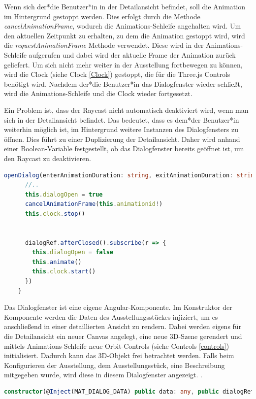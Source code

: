 Wenn sich der*die Benutzer*in in der Detailansicht befindet, soll die Animation im Hintergrund gestoppt werden. Dies erfolgt durch die Methode \emph{cancelAnimationFrame}, wodurch die Animations-Schleife angehalten wird. Um den aktuellen Zeitpunkt zu erhalten, zu dem die Animation gestoppt wird, wird die \emph{requestAnimationFrame} Methode verwendet. Diese wird in der Animations-Schleife aufgerufen und dabei wird der aktuelle Frame der Animation zurück geliefert. Um sich nicht mehr weiter in der Ausstellung fortbewegen zu können, wird die Clock (siehe Clock \ref{Clock}) gestoppt, die für die Three.js Controls benötigt wird. Nachdem der*die Benutzer*in das Dialogfenster wieder schließt, wird die Animations-Schleife und die Clock wieder fortgesetzt. 

Ein Problem ist, dass der Raycast nicht automatisch deaktiviert wird, wenn man sich in der Detailansicht befindet. Das bedeutet, dass es dem*der Benutzer*in weiterhin möglich ist, im Hintergrund weitere Instanzen des Dialogfensters zu öffnen. Dies führt zu einer Duplizierung der Detailansicht. Daher wird anhand einer Boolean-Variable festgestellt, ob das Dialogfenster bereits geöffnet ist, um den Raycast zu deaktivieren. 

\begin{lstlisting}[caption={Öffnen und Schließen des Dialogfensters},language=TypeScript]
  openDialog(enterAnimationDuration: string, exitAnimationDuration: string): void {
      //..
      this.dialogOpen = true
      cancelAnimationFrame(this.animationid!)
      this.clock.stop()
  
  
      dialogRef.afterClosed().subscribe(r => {
        this.dialogOpen = false
        this.animate()
        this.clock.start()
      })
    }
\end{lstlisting}

Das Dialogfenster ist eine eigene Angular-Komponente. Im Konstruktor der Komponente werden die Daten des Ausstellungsstückes injiziert, um es anschließend in einer detaillierten Ansicht zu rendern. Dabei werden eigens für die Detailansicht ein neuer Canvas angelegt, eine neue 3D-Szene gerendert und mittels Animations-Schleife neue Orbit-Controls (siehe Controls \ref{controls}) initialisiert. Dadurch kann das 3D-Objekt frei betrachtet werden. Falls beim Konfigurieren der Ausstellung, dem Ausstellungsstück, eine Beschreibung mitgegeben wurde, wird diese in diesem Dialogfenster angezeigt. .

  \begin{lstlisting}[caption={Constructor-Injection in der Dialog Komponente},language=TypeScript]
    constructor(@Inject(MAT_DIALOG_DATA) public data: any, public dialogRef: MatDialogRef<ExhibitDialog>) {}

  \end{lstlisting}
  
